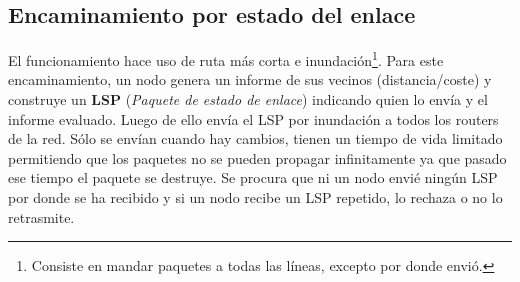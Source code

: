 \documentclass[
	12pt, %
	fleqn, %
	a4paper, %
	oneside, %
]{LegrandOrangeBook}
\begin{document}
\subsection{Encaminamiento por estado del enlace}
El funcionamiento hace uso de ruta más corta e inundación\footnote{Consiste en mandar paquetes a todas las líneas, excepto por donde envió.}. Para este encaminamiento, un nodo genera un informe de sus vecinos (distancia/coste) y construye un \textbf{LSP} (\emph{Paquete de estado de enlace}) indicando quien lo envía y el informe evaluado. Luego de ello envía el LSP por inundación a todos los routers de la red. Sólo se envían cuando hay cambios, tienen un tiempo de vida limitado permitiendo que los paquetes no se pueden propagar infinitamente ya que pasado ese tiempo el paquete se destruye. Se procura que ni un nodo envié ningún LSP por donde se ha recibido y si un nodo recibe un LSP repetido, lo rechaza o no lo retrasmite.
\end{document}
